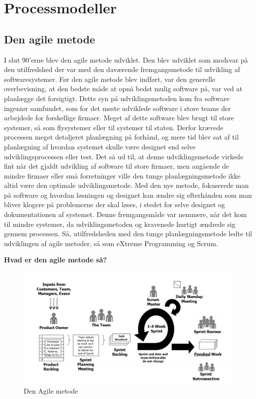\chapter{Processmodeller}\label{ch:processmodeller}

\section{Den agile metode}
I slut 90’erne blev den agile metode udviklet\cite{Sommerville}. Den blev udviklet som modsvar på den utilfredshed der var med den daværende fremgangsmetode til udvikling af softwaresystemer. Før den agile metode blev indført, var den generelle overbevisning, at den bedste måde at opnå bedst mulig software på, var ved at planlægge det forsigtigt\cite{Sommerville}. Dette syn på udviklingsmetoden kom fra software ingeniør samfundet, som for det meste udviklede software i store teams der arbejdede for forskellige firmaer. Meget af dette software blev brugt til store systemer, så som flysystemer eller til systemer til staten. Derfor krævede processen meget detaljeret planlægning på forhånd, og mere tid blev sat af til planlægning af hvordan systemet skulle være designet end selve udviklingsprocessen eller test\cite{Sommerville}.
Det så ud til, at denne udviklingsmetode virkede fint når det gjaldt udvikling af software til store firmaer, men angående de mindre firmaer eller små forretninger ville den tunge planlægningsmetode ikke altid være den optimale udviklingsmetode. Med den nye metode, fokuserede man på software og hvordan løsningen og designet kan ændre sig efterhånden som man bliver klogere på problemerne der skal løses, i stedet for selve designet og dokumentationen af systemet. Denne fremgangsmåde var nemmere, når det kom til mindre systemer, da udviklingsmetoden og kravenede hurtigt ændrede sig gennem processen\cite{Sommerville}. 
Så, utilfredsheden med den tunge planlægningsmetode ledte til udviklingen af agile metoder, så som eXtreme Programming og Scrum.


\textbf{Hvad er den agile metode så?}

\begin{figure}
    \includegraphics[width=\linewidth]{figures/AgileMetoder.png}
    \caption{Den Agile metode}
    \label{fig:Agil}
\end{figure}

